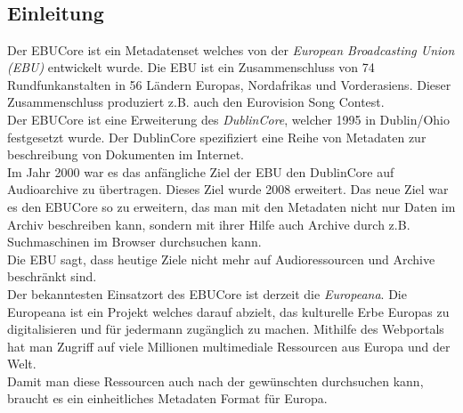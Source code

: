 	\subsection{\\Einleitung\\}
	Der EBUCore ist ein Metadatenset welches von der \emph{European Broadcasting Union (EBU)} entwickelt wurde. Die EBU ist ein Zusammenschluss von 74 Rundfunkanstalten  in 56 Ländern Europas, Nordafrikas und Vorderasiens. Dieser Zusammenschluss produziert z.B. auch den Eurovision Song Contest.\\ Der EBUCore ist eine Erweiterung des \emph{DublinCore}, welcher 1995 in Dublin/Ohio festgesetzt wurde. Der DublinCore spezifiziert eine Reihe von Metadaten zur beschreibung von Dokumenten im Internet.\\ Im Jahr 2000 war es das anfängliche Ziel der EBU den DublinCore auf Audioarchive zu übertragen. Dieses Ziel wurde 2008 erweitert. Das neue Ziel war es den EBUCore so zu erweitern, das man mit den Metadaten nicht nur Daten im Archiv beschreiben kann, sondern mit ihrer Hilfe auch Archive durch z.B. Suchmaschinen im Browser durchsuchen kann.\\Die EBU sagt, dass heutige Ziele nicht mehr auf Audioressourcen und Archive beschränkt sind.\\Der bekanntesten Einsatzort des EBUCore ist derzeit die \emph{Europeana}. Die Europeana ist ein Projekt welches darauf abzielt, das kulturelle Erbe Europas zu digitalisieren und für jedermann zugänglich zu machen. Mithilfe des Webportals hat man Zugriff auf viele Millionen multimediale Ressourcen aus Europa und der Welt.\\Damit man diese Ressourcen auch nach der gewünschten durchsuchen kann, braucht es ein einheitliches Metadaten Format für Europa.
	
